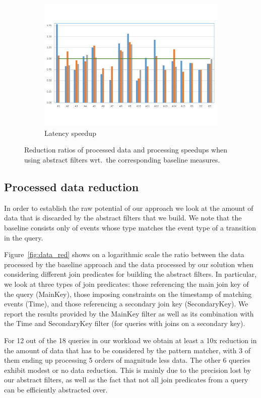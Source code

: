 \begin{figure}[t!]
\begin{subfigure}{\columnwidth}
\includegraphics[clip, trim=0.8cm 2cm 0.9cm 1.8cm,
width=\columnwidth]{graphs/latency_red.pdf}
\caption{Latency speedup}
\label{fig:latency_red}
\end{subfigure}

\caption{Reduction ratios of processed data and processing speedups when using
abstract filters wrt.\ the corresponding baseline measures.}
\end{figure}


\subsection{Processed data reduction}

In order to establish the raw potential of our approach we look at the amount of
data that is discarded by the abstract filters that we build.
We note that the baseline consists only of events whose type matches the event
type of a transition in the query.

Figure~\ref{fig:data_red} shows on a logarithmic scale the ratio between the
data processed by the baseline approach and the data processed by our solution
when considering different join predicates for building the abstract filters.
In particular, we look at three types of join predicates: those referencing
the main join key of the query (MainKey), those imposing constraints on the
timestamp of matching events (Time), and those referencing a secondary join key
(SecondaryKey).
We report the results provided by the MainKey filter as well as its combination
with the Time and SecondaryKey filter (for queries with joins on a secondary
key).
 
For 12 out of the 18 queries in our workload we obtain at least a 10x reduction
in the amount of data that has to be considered by the pattern matcher, with 3
of them ending up processing 5 orders of magnitude less data.
The other 6 queries exhibit modest or no data reduction. This is mainly due to
the precision lost by our abstract filters, as well as the fact that not all
join predicates from a query can be efficiently abstracted over. 


